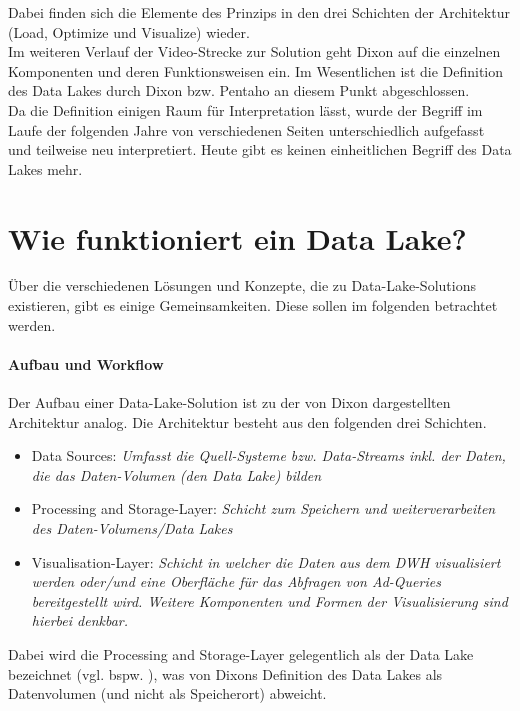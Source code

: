 \documentclass[twoside,twocolumn]{article}
\begin{document}
\noindent Dabei finden sich die Elemente des Prinzips in den drei Schichten der Architektur (Load, Optimize und Visualize) wieder.\cite{src6}\cite{src6b} \\
Im weiteren Verlauf der Video-Strecke zur Solution geht Dixon auf die einzelnen Komponenten und deren Funktionsweisen ein. Im Wesentlichen ist die Definition des Data Lakes durch Dixon bzw. Pentaho an diesem Punkt abgeschlossen.\\
Da die Definition einigen Raum für Interpretation lässt, wurde der Begriff im Laufe der folgenden Jahre von verschiedenen Seiten unterschiedlich aufgefasst und teilweise neu interpretiert. Heute gibt es keinen einheitlichen Begriff des Data Lakes mehr.\cite{src7}

\section{Wie funktioniert ein Data Lake?}
Über die verschiedenen Lösungen und Konzepte, die zu Data-Lake-Solutions existieren, gibt es einige Gemeinsamkeiten. Diese sollen im folgenden betrachtet werden.

\paragraph{Aufbau und Workflow}
Der Aufbau einer Data-Lake-Solution ist zu der von Dixon dargestellten Architektur analog.
Die Architektur besteht aus den folgenden drei Schichten.\cite{src8} \cite{src9}
\begin{itemize}
	\item Data Sources: \textit{Umfasst die Quell-Systeme bzw. Data-Streams inkl. der Daten, die das Daten-Volumen (den Data Lake) bilden}
	\item Processing and Storage-Layer: \textit{Schicht zum Speichern und weiterverarbeiten des Daten-Volumens/Data Lakes} 
	\item Visualisation-Layer: \textit{Schicht in welcher die Daten aus dem DWH visualisiert werden oder/und eine Oberfläche für das Abfragen von Ad-Queries bereitgestellt wird. Weitere Komponenten und Formen der Visualisierung sind hierbei denkbar.}
\end{itemize}

Dabei wird die Processing and Storage-Layer gelegentlich als der Data Lake bezeichnet (vgl. bspw. \cite{mdb}), was von Dixons Definition des Data Lakes als Datenvolumen (und nicht als Speicherort) abweicht.\\
\end{document}
